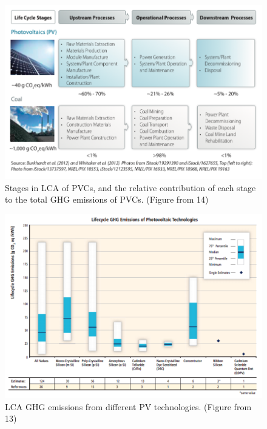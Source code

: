 \begin{figure}
\begin{center}
\includegraphics[scale=0.4]{pics/d3.png}
\caption{Stages in LCA of PVCs, and the relative contribution of each stage to the total GHG emissions of PVCs. (Figure from \cite{debbie}{14})}
\label{d3}
\end{center}
\end{figure}

\begin{figure}
\begin{center}
\includegraphics[scale=0.35]{pics/d4.png}
\caption{LCA GHG emissions from different PV technologies. (Figure from \cite{debbie}{13})}
\label{d4}
\end{center}
\end{figure}


